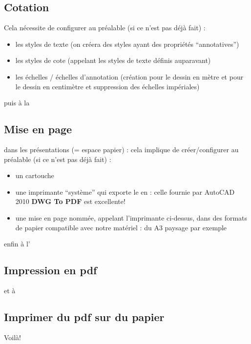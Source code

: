 \documentclass[a4paper,12pt,french]{sphinxmanual}
\begin{document}
\subsection{Cotation}
\label{init_su+acad/004_acad1:cotation}
Cela nécessite de configurer au préalable (si ce n'est pas déjà fait) :
\begin{itemize}
\item {} 
les styles de texte (on créera des styles ayant des propriétés ``annotatives'')

\item {} 
les styles de cote (appelant les styles de texte définis auparavant)

\item {} 
les échelles / échelles d'annotation (création pour le dessin en mètre et pour le dessin en centimètre et suppression des échelles impériales)

\end{itemize}

puis à la


\subsection{Mise en page}
\label{init_su+acad/004_acad1:mise-en-page}
dans les présentations (= espace papier) : cela implique de créer/configurer au préalable (si ce n'est pas déjà fait) :
\begin{itemize}
\item {} 
un cartouche

\item {} 
une imprimante ``système'' qui exporte le  en  : celle fournie par AutoCAD 2010 \textbf{DWG To PDF} est excellente!

\item {} 
une mise en page nommée, appelant l'imprimante ci-dessus, dans des formats de papier compatible avec notre matériel : du A3 paysage par exemple

\end{itemize}

enfin à l'


\subsection{Impression en pdf}
\label{init_su+acad/004_acad1:impression-en-pdf}
et à


\subsection{Imprimer du pdf sur du papier}
\label{init_su+acad/004_acad1:imprimer-du-pdf-sur-du-papier}
Voilà!
\end{document}
